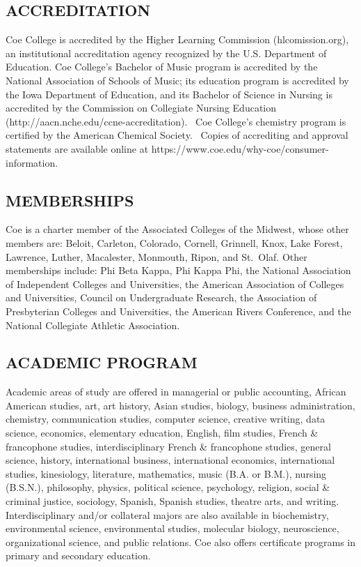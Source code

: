 \documentclass[
  letterpaper,
]{scrbook}
\begin{document}
\hypertarget{accreditation}{%
\subsection*{ACCREDITATION}\label{accreditation}}

Coe College is accredited by the Higher Learning Commission
(hlcomission.org), an institutional accreditation agency recognized by
the U.S. Department of Education. Coe College's Bachelor of Music
program is accredited by the National Association of Schools of Music;
its education program is accredited by the Iowa Department of Education,
and its Bachelor of Science in Nursing is accredited by the Commission
on Collegiate Nursing Education
(http://aacn.nche.edu/ccne-accreditation).~ Coe College's chemistry
program is certified by the American Chemical Society.~ Copies of
accrediting and approval statements are available online at
https://www.coe.edu/why-coe/consumer-information.

\hypertarget{memberships}{%
\subsection*{MEMBERSHIPS}\label{memberships}}

Coe is a charter member of the Associated Colleges of the Midwest, whose
other members are: Beloit, Carleton, Colorado, Cornell, Grinnell, Knox,
Lake Forest, Lawrence, Luther, Macalester, Monmouth, Ripon, and
St.~Olaf. Other memberships include: Phi Beta Kappa, Phi Kappa Phi, the
National Association of Independent Colleges and Universities, the
American Association of Colleges and Universities, Council on
Undergraduate Research, the Association of Presbyterian Colleges and
Universities, the American Rivers Conference, and the National
Collegiate Athletic Association.

\hypertarget{academic-program}{%
\subsection*{ACADEMIC PROGRAM}\label{academic-program}}

Academic areas of study are offered in managerial or public accounting,
African American studies, art, art history, Asian studies, biology,
business administration, chemistry, communication studies, computer
science, creative writing, data science, economics, elementary
education, English, film studies, French \& francophone studies,
interdisciplinary French \& francophone studies, general science,
history, international business, international economics, international
studies, kinesiology, literature, mathematics, music (B.A. or B.M.),
nursing (B.S.N.), philosophy, physics, political science, psychology,
religion, social \& criminal justice, sociology, Spanish, Spanish
studies, theatre arts, and writing. Interdisciplinary and/or collateral
majors are also available in biochemistry, environmental science,
environmental studies, molecular biology, neuroscience, organizational
science, and public relations. Coe also offers certificate programs in
primary and secondary education.
\end{document}
